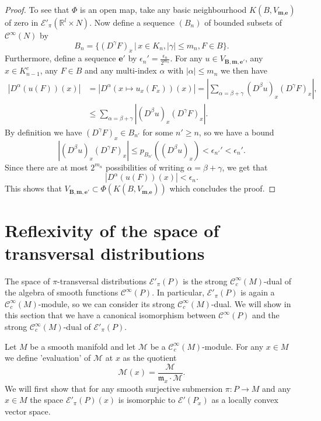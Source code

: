\documentclass[a4paper]{amsart}
\newcommand{\RR}{\mathbb{R}}
\newcommand{\cE}{\mathcal{E}}
\newcommand{\cM}{\mathcal{M}}
\newcommand{\fm}{\mathfrak{m}}
\newcommand{\C}{\mathord{\mathcal{C}^{\infty}}}
\newcommand{\Cc}{\mathord{\mathcal{C}^{\infty}_{c}}}
\begin{document}
\begin{proof}
To see that $\Phi$ is an open map, take any basic neighbourhood $K(B,V_{\textbf{m},\textbf{e}})$ of zero
in $\cE'_{\pi}(\RR^{l}\times N)$. Now define a sequence $(B_{n})$ of bounded subsets of $\C(N)$ by
\[
B_{n}=\{(D^{\gamma}F)_{x}\,|\,x\in K_{n},|\gamma|\leq m_{n},F\in B\}.
\]
Furthermore, define a sequence $\textbf{e}'$ by $\epsilon_{n}'=\frac{\epsilon_{n}}{2^{m_{n}}}$. For any 
$u\in V_{\textbf{B},\textbf{m},\textbf{e}'}$, any $x\in K_{n-1}^{c}$, any $F\in B$ and any multi-index $\alpha$ 
with $|\alpha|\leq m_{n}$ we then have
\begin{align*}
|D^{\alpha}(u(F))(x)|&=|D^{\alpha}(x\mapsto u_{x}(F_{x}))(x)|
=\left|\sum_{\alpha=\beta+\gamma}(D^{\beta}u)_{x}(D^{\gamma}F)_{x}\right|, \\
&\leq \sum_{\alpha=\beta+\gamma}|(D^{\beta}u)_{x}(D^{\gamma}F)_{x}|.
\end{align*}
By definition we have $(D^{\gamma}F)_{x}\in B_{n'}$ for some $n'\geq n$, so we have a bound 
\[
|(D^{\beta}u)_{x}(D^{\gamma}F)_{x}|\leq p_{B_{n'}}((D^{\beta}u)_{x})<\epsilon_{n'}'<\epsilon_{n}'.
\]
Since there are at most $2^{m_{n}}$ possibilities of writing $\alpha=\beta+\gamma$, we get that
\[
|D^{\alpha}(u(F))(x)|<\epsilon_{n}.
\]
This shows that $V_{\textbf{B},\textbf{m},\textbf{e}'}\subset\Phi(K(B,V_{\textbf{m},\textbf{e}}))$ which concludes the proof.
\end{proof}



\section{Reflexivity of the space of transversal distributions}

The space of $\pi$-transversal distributions $\cE'_{\pi}(P)$ is the strong $\Cc(M)$-dual of the algebra of smooth functions $\C(P)$. In 
particular, $\cE'_{\pi}(P)$ is again a $\Cc(M)$-module, so we can consider its strong $\Cc(M)$-dual. We will show in this section
that we have a canonical isomorphism between $\C(P)$ and the strong $\Cc(M)$-dual of $\cE'_{\pi}(P)$.

Let $M$ be a smooth manifold and let $\cM$ be a $\Cc(M)$-module. For any $x\in M$ we define 'evaluation' of $\cM$ at $x$ as the quotient
\[
\cM(x)=\frac{\cM}{\fm_{x}\cdot\cM}.
\] 
We will first show that for any smooth surjective submersion $\pi:P\to M$ and any $x\in M$ 
the space $\cE'_{\pi}(P)(x)$ is isomorphic to $\cE'(P_{x})$ as a locally convex vector space. 
\end{document}
